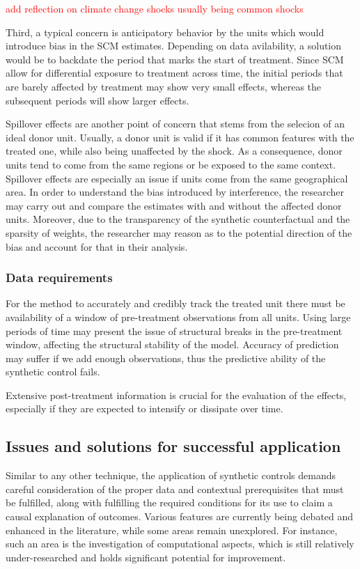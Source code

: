 \documentclass[12pt,a4paper,draft]{article}
\begin{document}
\textcolor{red}{add reflection on climate change shocks usually being common shocks}

Third, a typical concern is anticipatory behavior by the units which would 
introduce bias in the SCM estimates. Depending on data avilability, a solution 
would be to backdate the period that marks the start of treatment. Since SCM allow 
for differential exposure to treatment across time, the initial periods that 
are barely affected by treatment may show very small effects, whereas the subsequent 
periods will show larger effects.

Spillover effects are another point of concern that stems from the selecion of 
an ideal donor unit. Usually, a donor unit is valid if it has common features 
with the treated one, while also being unaffected by the shock. As a consequence, 
donor units tend to come from the same regions or be exposed to the same 
context. Spillover effects are especially an issue if units come from the same 
geographical area. In order to understand the bias introduced by interference, 
the researcher may carry out and compare the estimates with and without the 
affected donor units. Moreover, due to the transparency of the synthetic 
counterfactual and the sparsity of weights, the researcher may reason as to the 
potential direction of the bias and account for that in their analysis.

\subsubsection{Data requirements}
For the method to accurately and credibly track the treated unit there must be 
availability of a window of pre-treatment observations from all units. Using large 
periods of time may present the issue of structural breaks in the pre-treatment 
window, affecting the structural stability of the model. Accuracy of prediction 
may suffer if we add enough observations, thus the predictive ability of the 
synthetic control fails.

Extensive post-treatment information is crucial for the evaluation of the effects, 
especially if they are expected to intensify or dissipate over time.



\subsection{Issues and solutions for successful application} %
Similar to any other technique, the application of synthetic controls demands 
careful consideration of the proper data and contextual prerequisites that must be 
fulfilled, along with fulfilling the required conditions for its use to claim a 
causal explanation of outcomes. Various features are currently being debated and 
enhanced in the literature, while some areas remain unexplored. 
For instance, such an area is the investigation of computational aspects, 
which is still relatively under-researched and holds significant potential for 
improvement.
\end{document}
